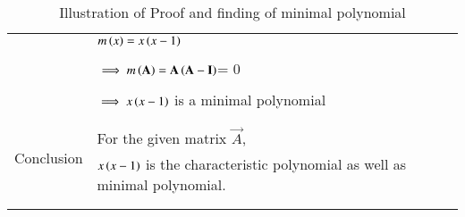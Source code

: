 \begin{longtable}{|c|l|}
	&$m\left(x\right)=x\left(x-1\right)$\\
	&\\
	& $\implies m\brak{\vec{A}}=\vec{A}\brak{\Vec{A}-\vec{I}}$= 0 \\
	&\\
	& $\implies x\left(x-1\right)$ is a minimal polynomial\\
	&\\
	\hline
	\multirow{3}{*}{Conclusion} & \\
	& For the given matrix $\Vec{A}$,\\
	&$x\left(x-1\right)$ is the characteristic polynomial as well as minimal polynomial.\\
	&\\
	\hline
	\caption{Illustration of Proof and finding of minimal polynomial}
    \label{eq:solutions/6/3/8/table:2}
\end{longtable}
